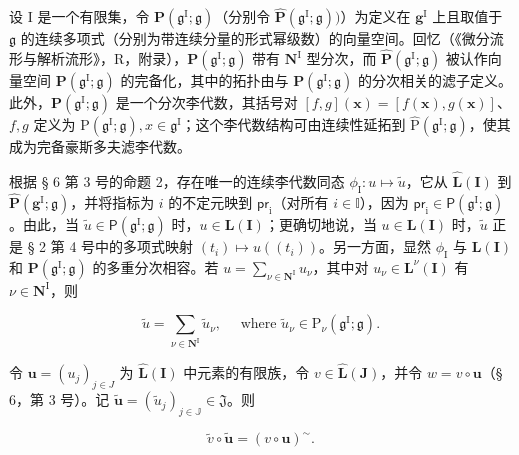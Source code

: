设 I 是一个有限集，令 \(\mathbf{P}(\mathfrak{g}^{\mathrm{I}};\mathfrak{g})\)（分别令 \(\hat{\mathbf{P}} (\mathfrak{g}^{\mathrm{I}};\mathfrak{g}))\)）为定义在 \(\mathbf{g}^{\mathrm{I}}\) 上且取值于 \(\mathfrak{g}\) 的连续多项式（分别为带连续分量的形式幂级数）的向量空间。回忆（《微分流形与解析流形》，R，附录），\(\mathbf{P}(\mathfrak{g}^{\mathrm{I}};\mathfrak{g})\) 带有 \(\mathbf{N}^{\mathrm{I}}\) 型分次，而 \(\hat{\mathbf{P}} (\mathfrak{g}^{\mathrm{I}};\mathfrak{g})\) 被认作向量空间 \(\mathbf{P} (\mathfrak{g}^{\mathrm{I}};\mathfrak{g})\) 的完备化，其中的拓扑由与 \(\mathbf{P}(\mathfrak{g}^{\mathrm{I}};\mathfrak{g})\) 的分次相关的滤子定义。此外，\(\mathbf{P}(\mathfrak{g}^{\mathrm{I}};\mathfrak{g})\) 是一个分次李代数，其括号对 \([f,g](\pmb {x}) = [f(\pmb {x}),g(\pmb {x})]\)、\(f, g\) 定义为 \(\mathrm{P}(\mathfrak{g}^{\mathrm{I}}; \mathfrak{g}), x \in \mathfrak{g}^{\mathrm{I}}\)；这个李代数结构可由连续性延拓到 \(\hat{\mathrm{P}}(\mathfrak{g}^{\mathrm{I}}; \mathfrak{g})\)，使其成为完备豪斯多夫滤李代数。

根据 § 6 第 3 号的命题 2，存在唯一的连续李代数同态 \(\phi_{\mathrm{I}}:u\mapsto \tilde{u}\)，它从 \(\hat{\mathbf{L}} (\mathbf{I})\) 到 \(\hat{\mathbf{P}} (\mathbf{g}^{\mathrm{I}};\mathfrak{g})\)，并将指标为 \(i\) 的不定元映到 \(\mathsf{pr}_{\mathrm{i}}\)（对所有 \(i\in \mathbb{I}\)），因为 \(\mathsf{pr}_{\mathrm{i}}\in \mathsf{P}(\mathfrak{g}^{\mathrm{I}};\mathfrak{g})\)。由此，当 \(\tilde{u}\in \mathsf{P}(\mathfrak{g}^{\mathrm{I}};\mathfrak{g})\) 时，\(u\in \mathbf{L}(\mathbf{I})\)；更确切地说，当 \(u\in \mathbf{L}(\mathbf{I})\) 时，\(\tilde{u}\) 正是 § 2 第 4 号中的多项式映射 \((t_i)\mapsto u((t_i))\)。另一方面，显然 \(\phi_{\mathrm{I}}\) 与 \(\mathbf{L}(\mathbf{I})\) 和 \(\mathbf{P}(\mathfrak{g}^{\mathrm{I}};\mathfrak{g})\) 的多重分次相容。若 \(u = \sum_{\nu \in \mathbf{N}^{\mathrm{I}}}u_{\nu}\)，其中对 \(u_{\nu}\in \mathbf{L}^{\nu}(\mathbf{I})\) 有 \(\nu \in \mathbf{N}^{\mathrm{I}}\)，则

\[
\tilde {u} = \sum_ {\nu \in \mathbf {N} ^ {\mathrm{I}}}  \tilde {u} _ {\nu}, \quad \text { where } \tilde {u} _ {\nu} \in \mathrm{P} _ {\nu} (\mathfrak {g} ^ {\mathrm{I}}; \mathfrak {g}).
\]

令 \(\pmb{u} = (u_j)_{j\in J}\) 为 \(\hat{\mathbf{L}} (\mathbf{I})\) 中元素的有限族，令 \(v\in \hat{\mathbf{L}} (\mathbf{J})\)，并令 \(w = v\circ \pmb {u}\)（§ 6，第 3 号）。记 \(\tilde{\pmb{u}} = (\tilde{u}_j)_{j\in \mathbb{J}}\in \mathfrak{J}\)。则

\[
\tilde {v} \circ \tilde {\boldsymbol {u}} = (v \circ \boldsymbol {u}) ^ {\sim}.\tag{2}
\]

